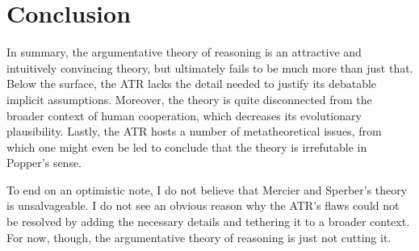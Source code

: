 \section{Conclusion}

In summary, the argumentative theory of reasoning is an attractive and intuitively convincing theory, but ultimately fails to be much more than just that. Below the surface, the ATR lacks the detail needed to justify its debatable implicit assumptions. Moreover, the theory is quite disconnected from the broader context of human cooperation, which decreases its evolutionary plausibility. Lastly, the ATR hosts a number of metatheoretical issues, from which one might even be led to conclude that the theory is irrefutable in Popper's sense.

To end on an optimistic note, I do not believe that Mercier and Sperber's theory is unsalvageable. I do not see an obvious reason why the ATR's flaws could not be resolved by adding the necessary details and tethering it to a broader context. For now, though, the argumentative theory of reasoning is just not cutting it.

